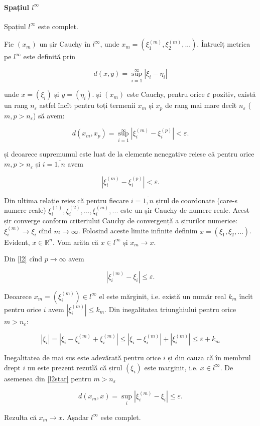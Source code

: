 \documentclass[a4paper,12pt]{article}
\theoremstyle{change}
\newenvironment{proof}[1][Proof]{\begin{trivlist}
\item[\hskip \labelsep {\bfseries #1}]}{\end{trivlist}}
\begin{document}
\paragraph{Spațiul $l^\infty$} Spațiul $l^\infty$ este complet.

\begin{proof}[Într-adevăr]

Fie $(x_m)$ un șir Cauchy în $l^\infty$, unde $x_m=(\xi_1^{(m)},\xi_2^{(m)},...)$. Întrucîț metrica pe $l^\infty$ este definită prin

\[
  d(x,y) = \sup_{i=1}^{\infty} |\xi_i - \eta_i|
\]

unde $x=(\xi_i)$ și $y=(\eta_i)$.  și $(x_m)$ este Cauchy, pentru orice $\varepsilon$ pozitiv, există un rang $n_{\varepsilon}$ astfel încît pentru toți termenii $x_m$ și $x_p$ de rang mai mare decît $n_{\varepsilon}$ ($m,p>n_{\varepsilon}$) să avem:

\[
d(x_m,x_p) = \sup_{i=1}^{\infty} |\xi_i^{(m)} - \xi_i^{(p)}| < \varepsilon.
\]

și deoarece supremumul este luat de la elemente nenegative reiese că pentru orice $m,p>n_\varepsilon$ și $i=\overline{1,n}$ avem

\[
\label{l2}
|\xi_i^{(m)} - \xi_i^{(p)}| < \varepsilon.
\]

Din ultima relație reies că pentru fiecare $i=\overline{1,n}$ șirul de coordonate (care-s numere reale) $\xi_i^{(1)}, \xi_i^{(2)}, ..., \xi_i^{(m)}, ...$ este un șir Cauchy de numere reale. Acest șir converge conform criteriului Cauchy de convergență a șirurilor numerice: $\xi_i^{(m)}\to \xi_i$ cînd $m\to\infty$. Folosind aceste limite infinite definim $x=(\xi_1,\xi_2,...)$. Evident, $x\in\mathbb{R}^n$. Vom arăta că $x\in l^\infty$ și $x_m\to x$.

Din \ref{l2} cînd $p\to\infty$ avem

\[
\label{l2star}
|\xi_i^{(m)} - \xi_i| \leq \varepsilon.
\]

Deoarece $x_m=(\xi_i^{(m)})\in l^\infty$ el este mărginit, i.e. există un număr real $k_m$ încît pentru orice $i$ avem $|\xi_i^{(m)}|\leq k_m$. Din inegalitatea triunghiului pentru orice $m>n_\varepsilon$:

\[
|\xi_i|=|\xi_i-\xi_i^{(m)}+\xi_i^{(m)}|\leq |\xi_i-\xi_i^{(m)}|+|\xi_i^{(m)}|\leq\varepsilon+k_m
\]

Inegalitatea de mai sus este adevărată pentru orice $i$ și din cauza că în membrul drept $i$ nu este prezent rezutlă că șirul $(\xi_i)$ este marginit, i.e. $x\in l^\infty$. De asemenea din \ref{l2star} pentru $m>n_\varepsilon$

\[
d(x_m,x)=\sup_i |\xi_i^{(m)}-\xi_i|\leq \varepsilon.
\]

Rezulta că $x_m\to x$. Așadar $l^\infty$ este complet.

\end{proof}
\end{document}
